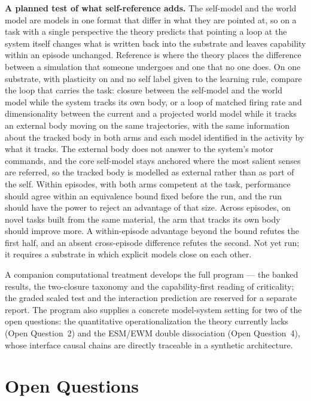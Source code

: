 \documentclass[12pt]{article}
\begin{document}
\textbf{A planned test of what self-reference adds.} The self-model and the world model are models in one format that differ in what they are pointed at, so on a task with a single perspective the theory predicts that pointing a loop at the system itself changes what is written back into the substrate and leaves capability within an episode unchanged. Reference is where the theory places the difference between a simulation that someone undergoes and one that no one does. On one substrate, with plasticity on and no self label given to the learning rule, compare the loop that carries the task: closure between the self-model and the world model while the system tracks its own body, or a loop of matched firing rate and dimensionality between the current and a projected world model while it tracks an external body moving on the same trajectories, with the same information about the tracked body in both arms and each model identified in the activity by what it tracks. The external body does not answer to the system's motor commands, and the core self-model stays anchored where the most salient senses are referred, so the tracked body is modelled as external rather than as part of the self. Within episodes, with both arms competent at the task, performance should agree within an equivalence bound fixed before the run, and the run should have the power to reject an advantage of that size. Across episodes, on novel tasks built from the same material, the arm that tracks its own body should improve more. A within-episode advantage beyond the bound refutes the first half, and an absent cross-episode difference refutes the second. Not yet run; it requires a substrate in which explicit models close on each other.

A companion computational treatment \citep{Gruber2026d} develops the full program --- the banked results, the two-closure taxonomy and the capability-first reading of criticality; the graded scaled test and the interaction prediction are reserved for a separate report. The program also supplies a concrete model-system setting for two of the open questions: the quantitative operationalization the theory currently lacks (Open Question~2) and the ESM/EWM double dissociation (Open Question~4), whose interface causal chains are directly traceable in a synthetic architecture.



\section{Open Questions}
\end{document}

